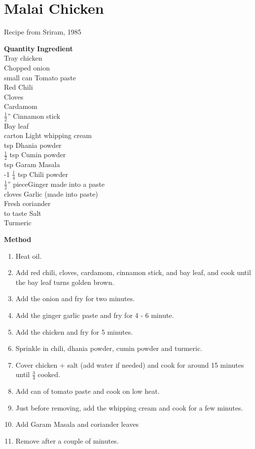 \section{Malai Chicken}
  Recipe from Sriram, 1985

\begin{tabbing}
\hspace{1.0cm}  \={\bf Quantity}   \hspace{3.0cm} \={\bf Ingredient}\\
    \>Tray chicken\\
    \>Chopped onion\\
 small can   \>Tomato paste \\
    \>Red Chili\\
    \>Cloves\\
    \>Cardamom\\
 \>$\frac{1}{2}$'' \>Cinnamon stick\\
    \>Bay leaf\\
  carton   \>Light whipping cream\\
  tsp   \>Dhania powder\\
 \>$\frac{1}{2}$ tsp   \>Cumin powder\\
  tsp   \>Garam Masala\\
 -1 $\frac{1}{4}$ tsp   \>Chili powder\\
\>$\frac{1}{2}$''   piece\>Ginger made into a paste\\
 cloves     \>Garlic  (made into paste)\\
\> \>Fresh coriander\\
\> to taste \>Salt\\
\>   \>Turmeric\\
\end{tabbing}

{\bf Method}
\begin{enumerate}
   \item Heat oil.
   \item Add  red chili, cloves, cardamom, cinnamon stick, and bay leaf, and cook until the
      bay leaf turns golden brown.
   \item Add the onion and fry for two minutes.
   \item Add the ginger garlic paste and fry for 4 - 6 minute.
   \item Add the chicken and fry for 5 minutes.
   \item Sprinkle in chili, dhania powder, cumin powder and turmeric.
   \item Cover chicken + salt (add water if needed) and cook  for  around  15
      minutes until $\frac{3}{4}$ cooked.
   \item Add can of tomato paste and cook on low heat.
   \item Just before removing, add the whipping cream and cook for a few minutes.
  \item Add Garam Masala and coriander leaves
  \item Remove after a couple of minutes.
\end{enumerate}

